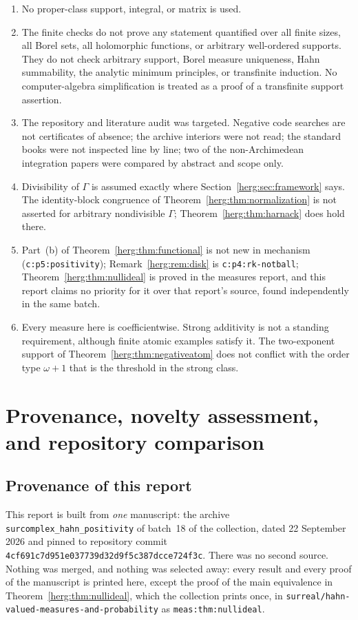 \documentclass[11pt,letterpaper]{article}
\theoremstyle{definition}
\newcommand{\repo}[1]{\nolinkurl{#1}}%
\newcommand{\lbl}[1]{\nolinkurl{#1}}%
\numberwithin{equation}{section}
\begin{document}
\begin{enumerate}[label=\arabic*.,leftmargin=2.2em]
\item No proper-class support, integral, or matrix is used.
\item The finite checks do not prove any statement quantified over all finite sizes, all Borel sets, all holomorphic functions, or arbitrary well-ordered supports. They do not check arbitrary support, Borel measure uniqueness, Hahn summability, the analytic minimum principles, or transfinite induction. No computer-algebra simplification is treated as a proof of a transfinite support assertion.
\item The repository and literature audit was targeted. Negative code searches are not certificates of absence; the archive interiors were not read; the standard books were not inspected line by line; two of the non-Archimedean integration papers were compared by abstract and scope only.
\item Divisibility of $\Gamma$ is assumed exactly where Section~\ref{herg:sec:framework} says. The identity-block congruence of Theorem~\ref{herg:thm:normalization} is not asserted for arbitrary nondivisible $\Gamma$; Theorem~\ref{herg:thm:harnack} does hold there.
\item Part~(b) of Theorem~\ref{herg:thm:functional} is not new in mechanism (\lbl{c:p5:positivity}); Remark~\ref{herg:rem:disk} is \lbl{c:p4:rk-notball}; Theorem~\ref{herg:thm:nullideal} is proved in the measures report, and this report claims no priority for it over that report's source, found independently in the same batch.
\item Every measure here is coefficientwise. Strong additivity is not a standing requirement, although finite atomic examples satisfy it. The two-exponent support of Theorem~\ref{herg:thm:negativeatom} does not conflict with the order type $\omega+1$ that is the threshold in the strong class.
\end{enumerate}

\appendix
\section{Provenance, novelty assessment, and repository comparison}
\label{herg:app:audit}

\subsection{Provenance of this report}
\label{herg:app:provenance}

This report is built from \emph{one} manuscript: the archive \texttt{surcomplex\_hahn\_positivity} of batch~18 of the collection, dated 22 September 2026 and pinned to repository commit \nolinkurl{4cf691c7d951e037739d32d9f5c387dcce724f3c}. There was no second source. Nothing was merged, and nothing was selected away: every result and every proof of the manuscript is printed here, except the proof of the main equivalence in Theorem~\ref{herg:thm:nullideal}, which the collection prints once, in \repo{surreal/hahn-valued-measures-and-probability} as \lbl{meas:thm:nullideal}.
\end{document}
